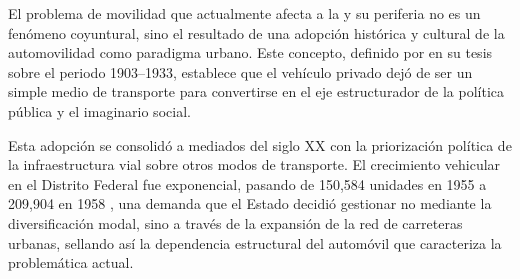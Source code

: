 El problema de movilidad que actualmente afecta a la \cdmx{} y su periferia no
es un fenómeno coyuntural, sino el resultado de una adopción histórica y
cultural de la automovilidad como paradigma urbano. Este concepto, definido por
\citet{franco2022} en su tesis sobre el periodo 1903--1933, establece que el
vehículo privado dejó de ser un simple medio de transporte para convertirse en
el eje estructurador de la política pública y el imaginario social.

Esta adopción se consolidó a mediados del siglo XX con la priorización política
de la infraestructura vial sobre otros modos de transporte. El crecimiento
vehicular en el Distrito Federal fue exponencial, pasando de 150,584 unidades en
1955 a 209,904 en 1958 \citep{perlo2023}, una demanda que el Estado decidió
gestionar no mediante la diversificación modal, sino a través de la expansión de
la red de carreteras urbanas, sellando así la dependencia estructural del
automóvil que caracteriza la problemática actual.
